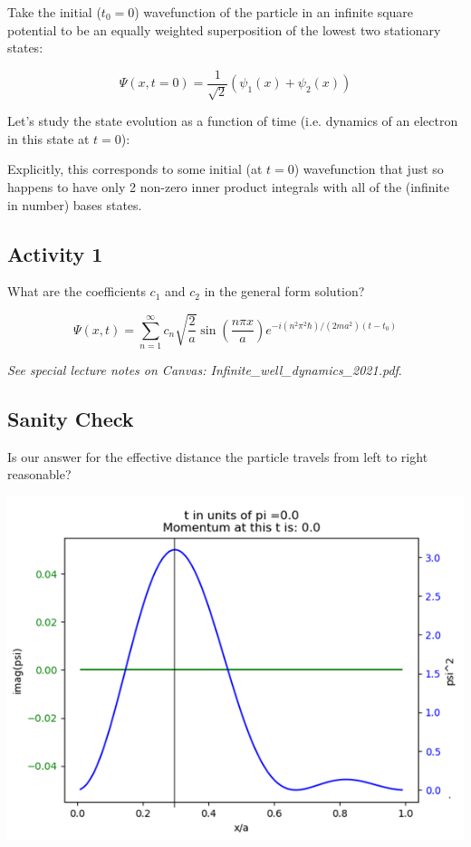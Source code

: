 \documentclass{article}
\begin{document}
Take the initial ($t_0 = 0$) wavefunction of the particle in an infinite square potential to be an equally weighted superposition of the lowest two stationary states:

$$\Psi(x,t=0) = \frac{1}{\sqrt{2}} \left( \psi_1(x) + \psi_2(x) \right)$$

Let's study the state evolution as a function of time (i.e. dynamics of an electron in this state at $t = 0$):

Explicitly, this corresponds to some initial (at $t=0$) wavefunction that just so happens to have only 2 non-zero inner product integrals with all of the  (infinite in number) bases states. 

\subsection{Activity 1}

What are the coefficients $c_1$ and $c_2$ in the general form solution?


$$\Psi(x,t) = \sum_{n=1}^\infty c_n \sqrt{\frac{2}{a}} \sin \left( \frac{n \pi x}{a} \right) e^{-i (n^2 \pi^2 \hbar)/(2ma^2)(t - t_0)}$$

\emph{See special lecture notes on Canvas: Infinite\_well\_dynamics\_2021.pdf}. 

\subsection*{Sanity Check}

Is our answer for the effective distance the particle travels from left to right reasonable?


\includegraphics[width = 0.7 \textwidth]{Lecture06/2.png}
\end{document}
